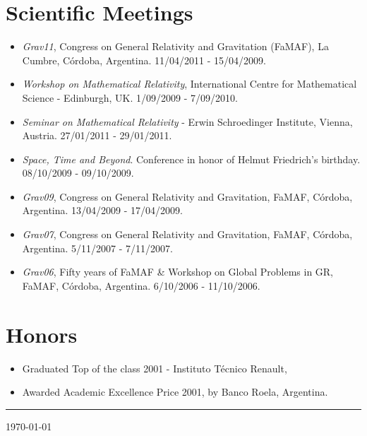 \documentclass[a4paper]{article}
\begin{document}
\section{Scientific Meetings}
\begin{itemize}
 \item \emph{Grav11}, Congress on General Relativity and Gravitation (FaMAF),
La Cumbre, Córdoba, Argentina. 11/04/2011 - 15/04/2009. 
 \item \emph{Workshop on Mathematical Relativity}, International Centre for
Mathematical Science - Edinburgh, UK. 1/09/2009 - 7/09/2010.
 \item \emph{Seminar on Mathematical Relativity} - Erwin Schroedinger
Institute, Vienna, Austria. 27/01/2011 - 29/01/2011.
 \item \emph{Space, Time and Beyond}. Conference in honor of Helmut
Friedrich's birthday.
08/10/2009 - 09/10/2009.
 \item \emph{Grav09}, Congress on General Relativity and Gravitation, FaMAF,
Córdoba, Argentina. 13/04/2009 - 17/04/2009. 
 \item \emph{Grav07}, Congress on General Relativity and Gravitation, FaMAF,
Córdoba, Argentina. 5/11/2007 - 7/11/2007. %
 \item \emph{Grav06}, Fifty years of FaMAF \& Workshop on Global Problems in GR,
FaMAF, Córdoba, Argentina. 6/10/2006 - 11/10/2006. %
\end{itemize}

\section{Honors}
\begin{itemize}
 \item Graduated Top of the class 2001 - Instituto Técnico Renault,%
 \item Awarded Academic Excellence Price 2001, by Banco Roela, Argentina.
\end{itemize}


\vspace{3\baselineskip}

\begin{flushright}
\rule{7cm}{0.2mm}

 \today
\end{flushright}
\end{document}
